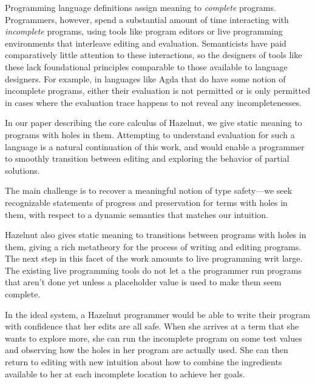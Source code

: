 Programming language definitions assign meaning to \textit{complete}
programs. Programmers, however, spend a substantial amount of time
interacting with \textit{incomplete} programs, using tools like program
editors or live programming environments that interleave editing and
evaluation. Semanticists have paid comparatively little attention to these
interactions, so the designers of tools like these lack foundational
principles comparable to those available to language designers. For
example, in languages like Agda that do have some notion of incomplete
programs, either their evaluation is not permitted or is only permitted in
cases where the evaluation trace happens to not reveal any
incompletenesses\cite{norell:thesis}.

In our paper describing the core calculus of Hazelnut, we give static
meaning to programs with holes in them\cite{DBLP:journals/corr/OmarVHAH16}.
Attempting to understand evaluation for such a language is a natural
continuation of this work, and would enable a programmer to smoothly
transition between editing and exploring the behavior of partial solutions.

The main challenge is to recover a meaningful notion of type safety---we
seek recognizable statements of progress and preservation for terms with
holes in them, with respect to a dynamic semantics that matches our
intuition.

Hazelnut also gives static meaning to transitions between programs with
holes in them, giving a rich metatheory for the process of writing and
editing programs. The next step in this facet of the work amounts to live
programming writ large\cite{burckhardt2013s}. The existing live
programming tools do not let a the programmer run programs that aren't done
yet unless a placeholder value is used to make them seem complete.

In the ideal system, a Hazelnut programmer would be able to write their
program with confidence that her edits are all safe. When she arrives at a
term that she wants to explore more, she can run the incomplete program on
some test values and observing how the holes in her program are actually
used. She can then return to editing with new intuition about how to
combine the ingredients available to her at each incomplete location to
achieve her goals.
